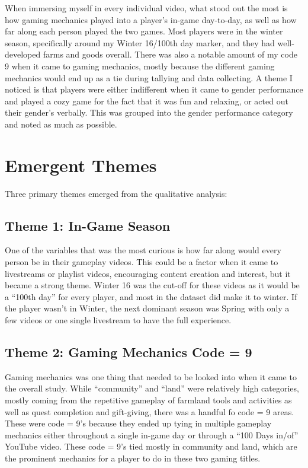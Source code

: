 \documentclass[
  12pt,
  letterpaper,
  DIV=11,
  numbers=noendperiod]{scrreprt}
\begin{document}
When immersing myself in every individual video, what stood out the most
is how gaming mechanics played into a player's in-game day-to-day, as
well as how far along each person played the two games. Most players
were in the winter season, specifically around my Winter 16/100th day
marker, and they had well-developed farms and goods overall. There was
also a notable amount of my code 9 when it came to gaming mechanics,
mostly because the different gaming mechanics would end up as a tie
during tallying and data collecting. A theme I noticed is that players
were either indifferent when it came to gender performance and played a
cozy game for the fact that it was fun and relaxing, or acted out their
gender's verbally. This was grouped into the gender performance category
and noted as much as possible.

\section{Emergent Themes}\label{emergent-themes}

Three primary themes emerged from the qualitative analysis:

\subsection{Theme 1: In-Game Season}\label{theme-1-in-game-season}

One of the variables that was the most curious is how far along would
every person be in their gameplay videos. This could be a factor when it
came to livestreams or playlist videos, encouraging content creation and
interest, but it became a strong theme. Winter 16 was the cut-off for
these videos as it would be a ``100th day'' for every player, and most
in the dataset did make it to winter. If the player wasn't in Winter,
the next dominant season was Spring with only a few videos or one single
livestream to have the full experience.

\subsection{Theme 2: Gaming Mechanics Code =
9}\label{theme-2-gaming-mechanics-code-9}

Gaming mechanics was one thing that needed to be looked into when it
came to the overall study. While ``community'' and ``land'' were
relatively high categories, mostly coming from the repetitive gameplay
of farmland tools and activities as well as quest completion and
gift-giving, there was a handful fo code = 9 areas. These were code =
9's because they ended up tying in multiple gameplay mechanics either
throughout a single in-game day or through a ``100 Days in/of'' YouTube
video. These code = 9's tied mostly in community and land, which are the
prominent mechanics for a player to do in these two gaming titles.
\end{document}
